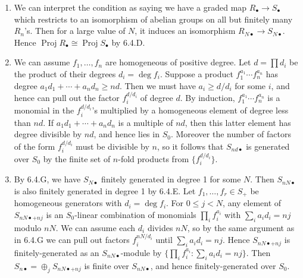 \documentclass{report}
\DeclareMathOperator{\Proj}{Proj}
\begin{document}
\begin{enumerate}[label=\textbf{6.4.\Alph*.}]
	\item We can interpret the condition as saying we have a graded map
	      $R_\bullet\to S_\bullet$ which restricts to an isomorphism of abelian
	      groups on all but finitely many $R_n$'s. Then for a large value of $N$,
	      it induces an isomorphism $R_{N\bullet}\to S_{N\bullet}$. Hence
	      $\Proj R_\bullet\cong\Proj S_\bullet$ by 6.4.D.

	\item We can assume $f_1,\ldots,f_n$ are homogeneous of positive degree.
	      Let $d=\prod d_i$ be the product of their degrees $d_i=\deg f_i$.
	      Suppose a product $f_1^{a_1}\cdots f_n^{a_n}$ has degree
	      $a_1d_1+\cdots+a_nd_n\ge nd$. Then we must have $a_i\ge d/d_i$ for some
	      $i$, and hence can pull out the factor $f_i^{d/d_i}$ of degree $d$. By
	      induction, $f_1^{a_1}\cdots f_n^{a_n}$ is a monomial in the
	      $f_i^{d/d_i}$'s multiplied by a homogeneous element of degree less than
	      $nd$. If $a_1d_1+\cdots+a_nd_n$ is a multiple of $nd$, then this latter
	      element has degree divisible by $nd$, and hence lies in $S_0$. Moreover
	      the number of factors of the form $f_i^{d/d_i}$ must be divisible by $n$,
	      so it follows that $S_{nd\bullet}$ is generated over $S_0$ by the finite
	      set of $n$-fold products from $\{f_i^{d/d_i}\}$.

	\item By 6.4.G, we have $S_{N\bullet}$ finitely generated in degree 1 for
	      some $N$. Then $S_{nN\bullet}$ is also finitely generated in degree 1 by
	      6.4.E. Let $f_1,\ldots,f_r\in S_+$ be homogeneous generators with
	      $d_i=\deg f_i$. For $0\le j<N$, any element of $S_{nN\bullet+nj}$ is an
	      $S_0$-linear combination of monomials $\prod_if_i^{a_i}$ with
	      $\sum_ia_id_i=nj$ modulo $nN$. We can assume each $d_i$ divides $nN$, so
	      by the same argument as in 6.4.G we can pull out factors $f_i^{nN/d_i}$
	      until $\sum_ia_id_i=nj$. Hence $S_{nN\bullet+nj}$ is finitely-generated
	      as an $S_{nN\bullet}$-module by $\{\prod_if_i^{a_i}:\sum_ia_id_i=nj\}$.
	      Then $S_{n\bullet}=\oplus_jS_{nN\bullet+nj}$ is finite over
	      $S_{nN\bullet}$, and hence finitely-generated over $S_0$.
\end{enumerate}
\end{document}
